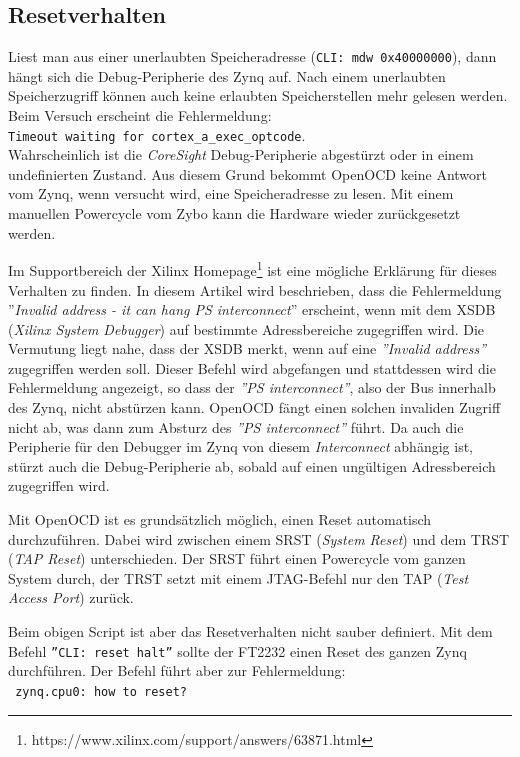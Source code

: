 \subsection{Resetverhalten}
Liest man aus einer unerlaubten Speicheradresse (\texttt{CLI: mdw 0x40000000}), dann hängt sich die Debug-Peripherie des Zynq auf.
Nach einem unerlaubten Speicherzugriff können auch keine erlaubten Speicherstellen mehr gelesen werden.
Beim Versuch erscheint die Fehlermeldung:\\
\texttt{Timeout waiting for cortex\_a\_exec\_optcode}.\\
Wahrscheinlich ist die \textit{CoreSight} Debug-Peripherie abgestürzt oder in einem undefinierten Zustand.
Aus diesem Grund bekommt OpenOCD keine Antwort vom Zynq, wenn versucht wird, eine Speicheradresse zu lesen.
Mit einem manuellen Powercycle vom Zybo kann die Hardware wieder zurückgesetzt werden.

Im Supportbereich der Xilinx Homepage\footnote{https://www.xilinx.com/support/answers/63871.html} ist eine mögliche Erklärung für dieses Verhalten zu finden.
In diesem Artikel wird beschrieben, dass die Fehlermeldung ''\textit{Invalid address - it can hang PS interconnect}'' erscheint, wenn mit dem XSDB (\textit{Xilinx System Debugger}) auf bestimmte Adressbereiche zugegriffen wird.
Die Vermutung liegt nahe, dass der XSDB merkt, wenn auf eine \textit{''Invalid address''} zugegriffen werden soll.
Dieser Befehl wird abgefangen und stattdessen wird die Fehlermeldung angezeigt, so dass der \textit{''PS interconnect''}, also der Bus innerhalb des Zynq, nicht abstürzen kann.
OpenOCD fängt einen solchen invaliden Zugriff nicht ab, was dann zum Absturz des \textit{''PS interconnect''} führt.
Da auch die Peripherie für den Debugger im Zynq von diesem \textit{Interconnect} abhängig ist, stürzt auch die Debug-Peripherie ab, sobald auf einen ungültigen Adressbereich zugegriffen wird.

Mit OpenOCD ist es grundsätzlich möglich, einen Reset automatisch durchzuführen.
Dabei wird zwischen einem SRST (\textit{System Reset}) und dem TRST (\textit{TAP Reset}) unterschieden.
Der SRST führt einen Powercycle vom ganzen System durch, der TRST setzt mit einem JTAG-Befehl nur den TAP (\textit{Test Access Port}) zurück.

Beim obigen Script ist aber das Resetverhalten nicht sauber definiert.
Mit dem Befehl \texttt{''CLI: reset halt''} sollte der FT2232 einen Reset des ganzen Zynq durchführen.
Der Befehl führt aber zur Fehlermeldung:\\
\texttt{
zynq.cpu0: how to reset?\\
}

